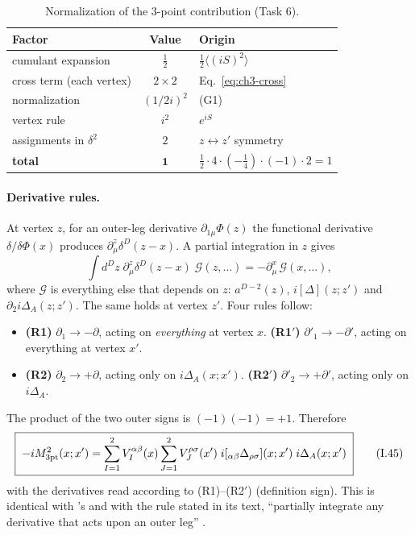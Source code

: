 \begin{table}[h]
\centering
\begin{tabular}{lcl}
\toprule
Factor & Value & Origin\\
\midrule
cumulant expansion & $\tfrac12$ & $\tfrac12\langle(iS)^2\rangle$\\
cross term (each vertex) & $2\times2$ & Eq.~\eqref{eq:ch3-cross}\\
normalization & $(1/2i)^2$ & (G1)\\
vertex rule & $i^2$ & $e^{iS}$\\
assignments in $\delta^2$ & $2$ & $z\leftrightarrow z'$ symmetry\\
\midrule
\textbf{total} & $\mathbf{1}$ & $\tfrac12\cdot4\cdot(-\tfrac14)\cdot(-1)\cdot2=1$\\
\bottomrule
\end{tabular}
\caption{Normalization of the 3-point contribution (Task 6).}
\label{tab:ch3-norm}
\end{table}

\paragraph{Derivative rules.}
At vertex $z$, for an outer-leg derivative $\partial_{1\mu}\Phi(z)$ the functional derivative $\delta/\delta\Phi(x)$ produces $\partial^z_\mu\delta^D(z-x)$.
A partial integration in $z$ gives
\begin{equation}
\int d^Dz\;\partial^z_\mu\delta^D(z-x)\;\mathcal G(z,\ldots)=-\partial^x_\mu\,\mathcal G(x,\ldots),
\label{eq:ch3-ibp}
\end{equation}
where $\mathcal G$ is everything else that depends on $z$: $a^{D-2}(z)$, $i[\Delta](z;z')$ and $\partial_2i\Delta_A(z;z')$. The same holds at vertex $z'$.
Four rules follow:
\begin{itemize}[leftmargin=14pt]
\item \textbf{(R1)} $\partial_1\to-\partial$, acting on \emph{everything} at vertex $x$. \textbf{(R1$'$)} $\partial'_1\to-\partial'$, acting on everything at vertex $x'$.
\item \textbf{(R2)} $\partial_2\to+\partial$, acting only on $i\Delta_A(x;x')$. \textbf{(R2$'$)} $\partial'_2\to+\partial'$, acting only on $i\Delta_A$.
\end{itemize}
The product of the two outer signs is $(-1)(-1)=+1$. Therefore
{%
\begin{equation}
\boxed{\;-iM^2_{\rm 3pt}(x;x')=\sum_{I=1}^2V_I^{\alpha\beta}(x)\sum_{J=1}^2V_J^{\rho\sigma}(x')\;i[{}_{\alpha\beta}\Delta_{\rho\sigma}](x;x')\;i\Delta_A(x;x')\;}
\tag{I.45}\label{eq:ch3-45}
\end{equation}
}
with the derivatives read according to (R1)--(R2$'$) (definition sign). This is identical with \PI's  and with the rule stated in its text,
``partially integrate any derivative that acts upon an outer leg'' \chIIIok.

